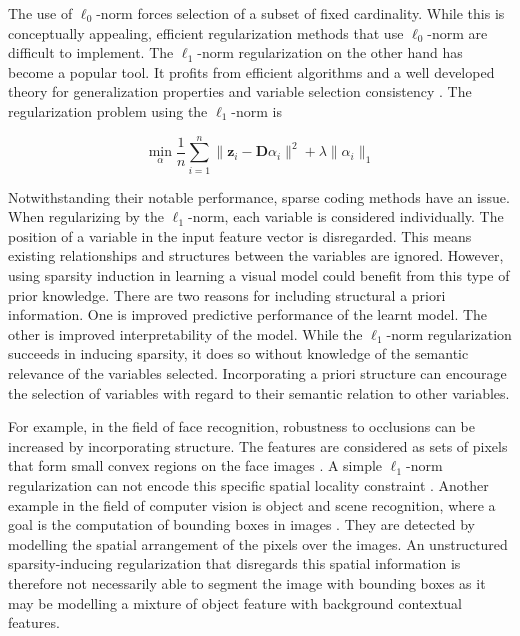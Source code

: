 The use of $\ell_{0}$-norm forces selection of a subset of fixed cardinality. While this is conceptually appealing, efficient regularization methods that use $\ell_{0}$-norm are difficult to implement. The $\ell_{1}$-norm regularization on the other hand has become a popular tool. It profits from efficient algorithms \citep{Efron2004, Lee2007, Yuen2009} and a well developed theory for generalization properties and variable selection consistency \citep{Shen2013, Zhang2009}. The regularization problem using the $\ell_{1}$-norm is

\begin{equation} \label{eq:l1normloss}
 \min_{\alpha} \frac{1}{n} \sum_{i=1}^{n} \parallel \mathbf{z}_{i} - \mathbf{D} \alpha_{i} \parallel^{2} + \lambda \parallel \alpha_{i} \parallel_{1}
\end{equation}

Notwithstanding their notable performance, sparse coding methods have an issue. When regularizing by the $\ell_{1}$-norm, each variable is considered individually. The position of a variable in the input feature vector is disregarded. This means existing relationships and structures between the variables are ignored. However, using sparsity induction in learning a visual model could benefit from this type of prior knowledge. There are two reasons for including structural a priori information. One is improved predictive performance of the learnt model. The other is improved interpretability of the model. While the $\ell_{1}$-norm regularization succeeds in inducing sparsity, it does so without knowledge of the semantic relevance of the variables selected. Incorporating a priori structure can encourage the selection of variables with regard to their semantic relation to other variables.

For example, in the field of face recognition, robustness to occlusions can be increased by incorporating structure. The features are considered as sets of pixels that form small convex regions on the face images \citep{Jenatton2010}. A simple $\ell_{1}$-norm regularization can not encode this specific spatial locality constraint \citep{Jenatton2010}. Another example in the field of computer vision is object and scene recognition, where a goal is the computation of bounding boxes in images \citep{Harzallah2009}. They are detected by modelling the spatial arrangement of the pixels over the images. An unstructured sparsity-inducing regularization that disregards this spatial information is therefore not necessarily able to segment the image with bounding boxes as it may be modelling a mixture of object feature with background contextual features.

